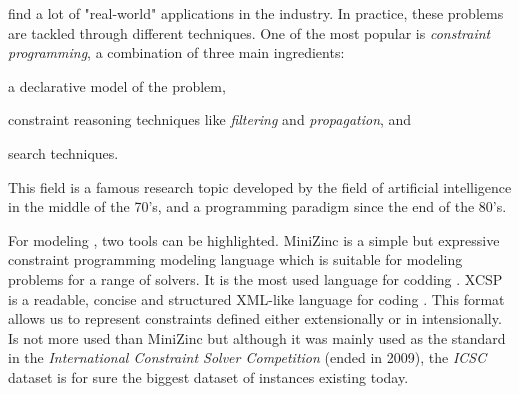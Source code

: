 \csps{} find a lot of "real-world" applications in the industry. In practice, these problems are tackled through different techniques. One of the most popular is \textit{constraint programming}, a combination of three main ingredients: \begin{inparaenum}[i)] \item a declarative model of the problem, \item constraint reasoning techniques like \textit{filtering} and \textit{propagation}, and \item search techniques. \end{inparaenum} This field is a famous research topic developed by the field of artificial intelligence in the middle of the 70's, and a programming paradigm since the end of the 80's.


For modeling \csps{}, two tools can be highlighted. {\sc MiniZinc} is a simple but expressive constraint programming modeling language which is suitable for modeling problems for a range of solvers. It is the most used language for codding \csps{} \cite{Nethercote}. {\sc XCSP} is a readable, concise and structured XML-like language for coding \csps. This format allows us to represent constraints defined either extensionally or in intensionally. Is not more used than {\sc MiniZinc} but although it was mainly used as the standard in the {\it International Constraint Solver Competition} (ended in 2009), the {\it ICSC} dataset is for sure the biggest dataset of \csps{} instances existing today.


